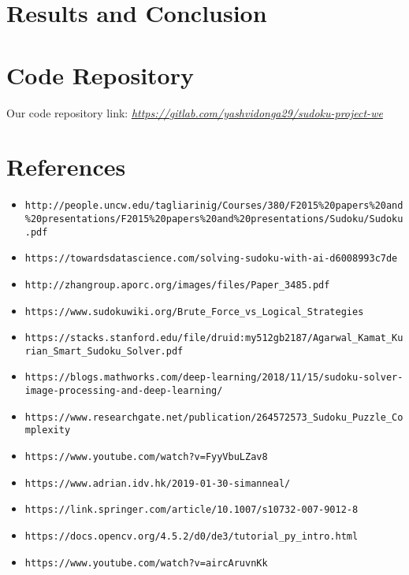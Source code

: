 \documentclass{article}
\begin{document}
    \section{Results and Conclusion}
     
    \section{Code Repository} 
    Our code repository link: \href{https://gitlab.com/yashvidonga29/sudoku-project-we}{\emph{https://gitlab.com/yashvidonga29/sudoku-project-we}}
    \section{References}   
    \begin{itemize}
        \item \nolinkurl{http://people.uncw.edu/tagliarinig/Courses/380/F2015%20papers%20and%20presentations/F2015%20papers%20and%20presentations/Sudoku/Sudoku.pdf}
        \item \nolinkurl{https://towardsdatascience.com/solving-sudoku-with-ai-d6008993c7de}
        \item \nolinkurl{http://zhangroup.aporc.org/images/files/Paper_3485.pdf}
        \item \nolinkurl{https://www.sudokuwiki.org/Brute_Force_vs_Logical_Strategies}
        \item \nolinkurl{https://stacks.stanford.edu/file/druid:my512gb2187/Agarwal_Kamat_Kurian_Smart_Sudoku_Solver.pdf}
        \item \nolinkurl{https://blogs.mathworks.com/deep-learning/2018/11/15/sudoku-solver-image-processing-and-deep-learning/}
        \item \nolinkurl{https://www.researchgate.net/publication/264572573_Sudoku_Puzzle_Complexity}
        \item \nolinkurl{https://www.youtube.com/watch?v=FyyVbuLZav8}
        \item \nolinkurl{https://www.adrian.idv.hk/2019-01-30-simanneal/}
        \item \nolinkurl{https://link.springer.com/article/10.1007/s10732-007-9012-8}
        \item \nolinkurl{https://docs.opencv.org/4.5.2/d0/de3/tutorial_py_intro.html}
        \item \nolinkurl{https://www.youtube.com/watch?v=aircAruvnKk}
    \end{itemize}
\end{document}
